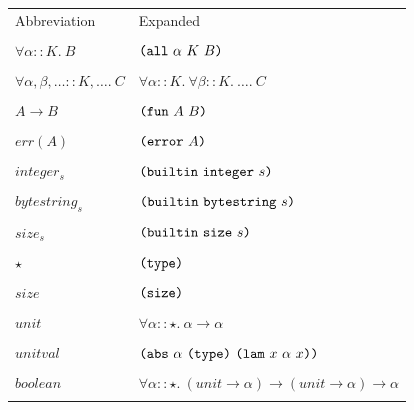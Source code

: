 \documentclass[../main.tex]{subfiles}
\begin{document}
\begin{figure*}[t]
    \footnotesize
    
    \begin{tabular}{ll}
        \textrm{Abbreviation} & \textrm{Expanded}\\\\
        
        $\forall \alpha :: K.\ B$ & \(\texttt{(} \texttt{all} ~ \alpha ~ K ~ B \texttt{)}\)\\\\
        
        $\forall \alpha, \beta, \ldots :: K, \ldots.\ C$ & \(\forall \alpha :: K.\ \forall \beta :: K.\ \ldots.\ C\)\\\\
        
        $A \to B$ & \(\texttt{(} \texttt{fun} ~ A ~ B \texttt{)}\)\\\\
        
        $err(A)$ & \(\texttt{(} \texttt{error} ~ A \texttt{)}\)\\\\
        
        $integer_s$ & \(\texttt{(} \texttt{builtin} ~ \texttt{integer} ~ s \texttt{)}\)\\\\
        
        $bytestring_s$ & \(\texttt{(} \texttt{builtin} ~ \texttt{bytestring} ~ s \texttt{)}\)\\\\
        
        $size_s$ & \(\texttt{(} \texttt{builtin} ~ \texttt{size} ~ s \texttt{)}\)\\\\
        
        $\star$ & \(\texttt{(} \texttt{type} \texttt{)}{}\)\\\\
        
        $size$ & \(\texttt{(} \texttt{size} \texttt{)}{}\)\\\\
        
        $unit$ & \(\forall \alpha :: \star.\ \alpha \to \alpha\)\\\\
        
        $unitval$ & \(\texttt{(} \texttt{abs} ~ \alpha ~ \texttt{(} \texttt{type} \texttt{)}{} ~ \texttt{(} \texttt{lam} ~ x ~ \alpha ~ x \texttt{)} \texttt{)}\)\\\\
        
        $boolean$ & \(\forall \alpha :: \star.\ (unit \to \alpha) \to (unit \to \alpha) \to \alpha\)\\\\
        

\end{tabular}
\end{figure*}
\end{document}
